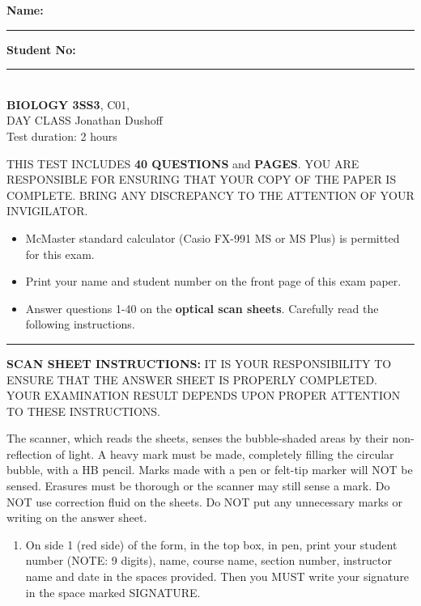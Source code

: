 

\textbf{Name:} \rule{5cm}{1pt} \hfill \textbf{Student No:} \rule{5cm}{1pt} \\

\bigskip\noindent \hfill {\large {\bf BIOLOGY 3SS3}, C01,
	\testver
} \hspace*{\fill} \\
DAY CLASS  \hfill Jonathan Dushoff \\
Test duration: 2 hours \hfill \term

{\small

\medskip\noindent THIS TEST INCLUDES {\bf 40 QUESTIONS} and \textbf{\pageref{LastPage} PAGES}. YOU ARE RESPONSIBLE FOR ENSURING THAT YOUR COPY OF THE PAPER IS COMPLETE. BRING ANY DISCREPANCY TO THE ATTENTION OF YOUR INVIGILATOR. 

\begin{itemize}
\item McMaster standard calculator (Casio FX-991 MS or MS Plus) is permitted for this exam.
\item Print your name and student number on the front page of this exam paper.
\item Answer questions 1-40 on the \textbf{optical scan sheets}.  Carefully read the following instructions.
\end{itemize}
\hrule
\bigskip\textbf{SCAN SHEET INSTRUCTIONS:} 
IT IS YOUR RESPONSIBILITY TO ENSURE THAT THE ANSWER SHEET IS PROPERLY COMPLETED. YOUR EXAMINATION RESULT DEPENDS UPON PROPER ATTENTION TO THESE INSTRUCTIONS.

The scanner, which reads the sheets, senses the bubble-shaded areas by their non-reflection of light.  A heavy mark must be made, completely filling the circular bubble, with a HB pencil.  Marks made with a pen or felt-tip marker will NOT be sensed.  Erasures must be thorough or the scanner may still sense a mark.  Do NOT use correction fluid on the sheets.  Do NOT put any unnecessary marks or writing on the answer sheet.

\begin{enumerate}

\item On side 1 (red side) of the form, in the top box, in pen, print your student number (NOTE: 9 digits), name, course name, section number, instructor name and date in the spaces provided.  Then you MUST write your signature in the space marked SIGNATURE.


\end{enumerate}}
